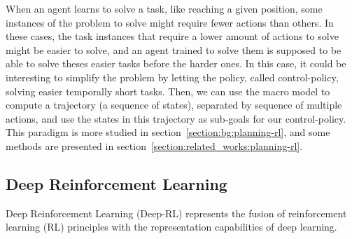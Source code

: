 When an agent learns to solve a task, like reaching a given position, some instances of the problem to solve might
require fewer actions than others.
In these cases, the task instances that require a lower amount of actions to solve might be easier to solve, and an agent
trained to solve them is supposed to be able to solve theses easier tasks before the harder ones.
In this case, it could be interesting to simplify the problem by letting the policy, called control-policy, solving easier temporally short tasks. %
Then, we can use the macro model to compute a trajectory (a sequence of states), separated by sequence of multiple
actions, and use the states in this trajectory as sub-goals for our control-policy. %
This paradigm is more studied in section~\ref{section:bg:planning-rl}, and some methods are presented in
section~\ref{section:related_works:planning-rl}.

\subsection{Deep Reinforcement Learning}\label{subsection:bg:rl:deep-reinforcement-learning}

Deep Reinforcement Learning (Deep-RL) represents the fusion of reinforcement learning (RL) principles with the
representation capabilities of deep learning. %

